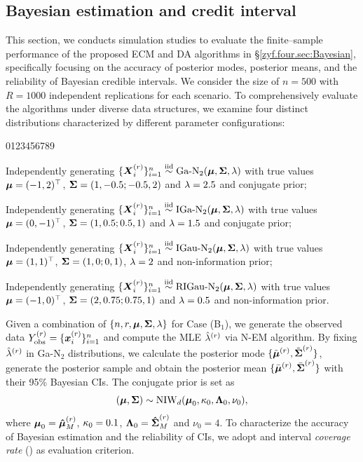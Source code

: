 \subsection{Bayesian estimation and credit interval}        %

This section, we conducts simulation studies to evaluate the finite--sample performance of the proposed ECM and DA algorithms in \S\ref{zyf.four.sec:Bayesian}, specifically focusing on the accuracy of posterior modes, posterior means, and the reliability of Bayesian credible intervals. We consider the size of $n = 500$ with $R = 1000$ independent replications for each scenario. To comprehensively evaluate the algorithms under diverse data structures, we examine four distinct distributions characterized by different parameter configurations:
\begin{namelist}{0123456789}
\item[\hspace*{-0.05cm} Case (B$_1$):] Independently generating $\{{\boldsymbol{X}}_i^{(r)}\}_{i=1}^n \stackrel{{\rm iid}}{\sim} \mbox{Ga-N}_2({\boldsymbol{\mu}}, {\mbox{\boldmath$\Sigma$}}, \lambda)$ with true values ${\boldsymbol{\mu}} = (-1, 2)^\top$, ${\mbox{\boldmath$\Sigma$}} = (1, -0.5; -0.5, 2)$ and $\lambda = 2.5$ and conjugate prior;

\item[\hspace*{-0.05cm} Case (B$_2$):] Independently generating $\{{\boldsymbol{X}}_i^{(r)}\}_{i=1}^n \stackrel{{\rm iid}}{\sim} \mbox{IGa-N}_2({\boldsymbol{\mu}}, {\mbox{\boldmath$\Sigma$}}, \lambda)$ with true values ${\boldsymbol{\mu}} = (0, -1)^\top$, ${\mbox{\boldmath$\Sigma$}} = (1, 0.5; 0.5, 1)$ and $\lambda = 1.5$ and conjugate prior;

\item[\hspace*{-0.05cm} Case (B$_3$):] Independently generating $\{{\boldsymbol{X}}_i^{(r)}\}_{i=1}^n \stackrel{{\rm iid}}{\sim} \mbox{IGau-N}_2({\boldsymbol{\mu}}, {\mbox{\boldmath$\Sigma$}}, \lambda)$ with true values ${\boldsymbol{\mu}} = (1, 1)^\top$, ${\mbox{\boldmath$\Sigma$}} = (1, 0; 0, 1)$, $\lambda = 2$ and non-information prior;

\item[\hspace*{-0.05cm} Case (B$_4$):] Independently generating $\{{\boldsymbol{X}}_i^{(r)}\}_{i=1}^n \stackrel{{\rm iid}}{\sim} \mbox{RIGau-N}_2({\boldsymbol{\mu}}, {\mbox{\boldmath$\Sigma$}}, \lambda)$ with true values ${\boldsymbol{\mu}} = (-1, 0)^\top$, ${\mbox{\boldmath$\Sigma$}} = (2, 0.75; 0.75, 1)$ and $\lambda = 0.5$ and non-information prior.
\end{namelist}
Given a combination of $\{n, r, {\boldsymbol{\mu}}, {\mbox{\boldmath$\Sigma$}}, \lambda\}$ for Case (B$_1$), we generate the observed data $Y_{\rm obs}^{(r)} = \{{\boldsymbol{x}}_i^{(r)}\}_{i=1}^n$ and compute the MLE $\hat{\lambda}^{(r)}$ via N-EM algorithm. By fixing $\hat{\lambda}^{(r)}$ in Ga-N$_2$ distributions, we calculate the posterior mode $\{\tilde{{\boldsymbol{\mu}}}^{(r)}, \tilde{{\mbox{\boldmath$\Sigma$}}}^{(r)}\}$, generate the posterior sample and obtain the posterior mean $\{\bar{{\boldsymbol{\mu}}}^{(r)}, \bar{{\mbox{\boldmath$\Sigma$}}}^{(r)}\}$ with their 95\% Bayesian CIs. The conjugate prior is set as
$$
    ({\boldsymbol{\mu}}, {\mbox{\boldmath$\Sigma$}}) \sim \mbox{NIW}_d({\boldsymbol{\mu}}_0, \kappa_0, {\mbox{\boldmath$\Lambda$}}_0, \nu_0),
$$
where ${\boldsymbol{\mu}}_0 = \boldsymbol{\hat{\mu}}_M^{(r)}$, $\kappa_0 = 0.1$, ${\mbox{\boldmath$\Lambda$}}_0 = \boldsymbol{\hat{\Sigma}}_M^{(r)}$ and $\nu_0 = 4$. To characterize the accuracy of Bayesian estimation and the reliability of CIs, we adopt  and interval \textit{coverage rate} () as evaluation criterion.

